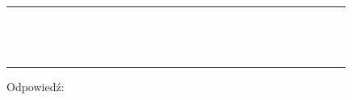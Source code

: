 \documentclass[10pt]{article}
\begin{document}
\begin{center}
\begin{tabular}{|c|c|c|c|c|c|c|c|c|c|c|c|c|c|c|c|c|c|c|c|c|c|c|c|c|c|c|c|c|c|}
\hline
 &  &  &  &  &  &  &  &  &  &  &  &  &  &  &  &  &  &  &  &  &  &  &  &  &  &  &  &  &  \\
\hline
 &  &  &  &  &  &  &  &  &  &  &  &  &  &  &  &  &  &  &  &  &  &  &  &  &  &  &  &  &  \\
\hline
 &  &  &  &  &  &  &  &  &  &  &  &  &  &  &  &  &  &  &  &  &  &  &  &  &  &  &  &  &  \\
\hline
 &  &  &  &  &  &  &  &  &  &  &  &  &  &  &  &  &  &  &  &  &  &  &  &  &  &  &  &  &  \\
\hline
 &  &  &  &  &  &  &  &  &  &  &  &  &  &  &  &  &  &  &  &  &  &  &  &  &  &  &  &  &  \\
\hline
 &  &  &  &  &  &  &  &  &  &  &  &  &  &  &  &  &  &  &  &  &  &  &  &  &  &  &  &  &  \\
\hline
 &  &  &  &  &  &  &  &  &  &  &  &  &  &  &  &  &  &  &  &  &  &  &  &  &  &  &  &  &  \\
\hline
 &  &  &  &  &  &  &  &  &  &  &  &  &  &  &  &  &  &  &  &  &  &  &  &  &  &  &  &  &  \\
\hline
 &  &  &  &  &  &  &  &  &  &  &  &  &  &  &  &  &  &  &  &  &  &  &  &  &  &  &  &  &  \\
\hline
 &  &  &  &  &  &  &  &  &  &  &  &  &  &  &  &  &  &  &  &  &  &  &  &  &  &  &  &  &  \\
\hline
 &  &  &  &  &  &  &  &  &  &  &  &  &  &  &  &  &  &  &  &  &  &  &  &  &  &  &  &  &  \\
\hline
 &  &  &  &  &  &  &  &  &  &  &  &  &  &  &  &  &  &  &  &  &  &  &  &  &  &  &  &  &  \\
\hline
 &  &  &  &  &  &  &  &  &  &  &  &  &  &  &  &  &  &  &  &  &  &  &  &  &  &  &  &  &  \\
\hline
 &  &  &  &  &  &  &  &  &  &  &  &  &  &  &  &  &  &  &  &  &  &  &  &  &  &  &  &  &  \\
\hline
 &  &  &  &  &  &  &  &  &  &  &  &  &  &  &  &  &  &  &  &  &  &  &  &  &  &  &  &  &  \\
\hline
\end{tabular}
\end{center}

Odpowiedź: \(\qquad\)
\end{document}
